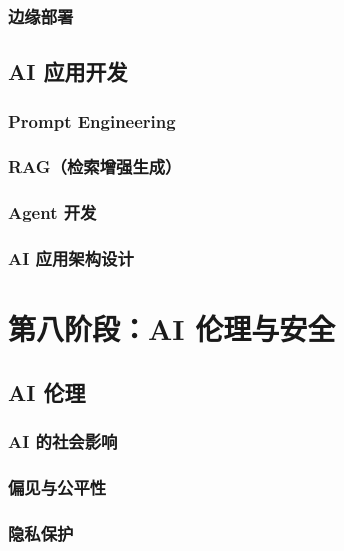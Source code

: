\documentclass[12pt,UTF8]{ctexbook}
\begin{document}
\section{边缘部署}
\label{sec:edge_deployment}

\chapter{AI 应用开发}
\label{chap:ai_app_dev}

\section{Prompt Engineering}
\label{sec:prompt_engineering}

\section{RAG（检索增强生成）}
\label{sec:rag}

\section{Agent 开发}
\label{sec:agent_dev}

\section{AI 应用架构设计}
\label{sec:ai_architecture}

\part{第八阶段：AI 伦理与安全}

\chapter{AI 伦理}
\label{chap:ai_ethics}

\section{AI 的社会影响}

\section{偏见与公平性}

\section{隐私保护}
\end{document}
